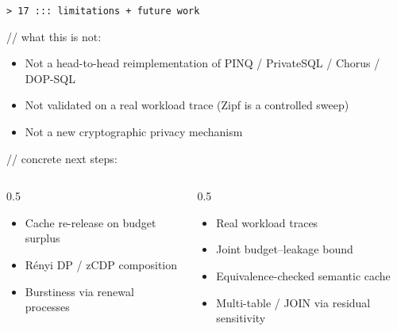 \documentclass[aspectratio=169,10pt]{beamer}
\begin{document}
\begin{frame}{\texttt{> 17 ::: limitations + future work}}

{\color{magenta}\ttfamily // what this is not:}
\begin{itemize}
  \item Not a head-to-head reimplementation of PINQ / PrivateSQL / Chorus / DOP-SQL
  \item Not validated on a real workload trace (Zipf is a controlled sweep)
  \item Not a new cryptographic privacy mechanism
\end{itemize}

\vspace{0.6em}
{\color{neon}\ttfamily // concrete next steps:}
\begin{columns}[T,onlytextwidth]
\begin{column}{0.5\textwidth}
\begin{itemize}\small
  \item Cache re-release on budget surplus
  \item R\'enyi DP / zCDP composition
  \item Burstiness via renewal processes
\end{itemize}
\end{column}
\begin{column}{0.5\textwidth}
\begin{itemize}\small
  \item Real workload traces
  \item Joint budget--leakage bound
  \item Equivalence-checked semantic cache
  \item Multi-table / JOIN via residual sensitivity
\end{itemize}
\end{column}
\end{columns}

\end{frame}
\end{document}
